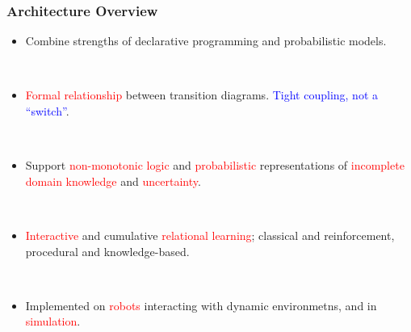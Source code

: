 \documentclass[xcolor=dvipsnames]{beamer}
\begin{document}
\begin{frame}\frametitle{Architecture Overview}
  \begin{itemize}
  \item Combine strengths of declarative programming and probabilistic
    models.
    
    \ \\
  \item \textcolor{red}{Formal relationship} between transition
    diagrams. \textcolor{blue}{Tight coupling, not a ``switch''}.

    \ \\
  \item Support \textcolor{red}{non-monotonic logic} and
    \textcolor{red}{probabilistic} representations of
    \textcolor{red}{incomplete domain knowledge} and
    \textcolor{red}{uncertainty}.

    \ \\
  \item \textcolor{red}{Interactive} and cumulative
    \textcolor{red}{relational learning}; classical and reinforcement,
    procedural and knowledge-based.

    \ \\
  \item Implemented on \textcolor{red}{robots} interacting with
    dynamic environmetns, and in \textcolor{red}{simulation}.
  \end{itemize}
\end{frame}
\end{document}
